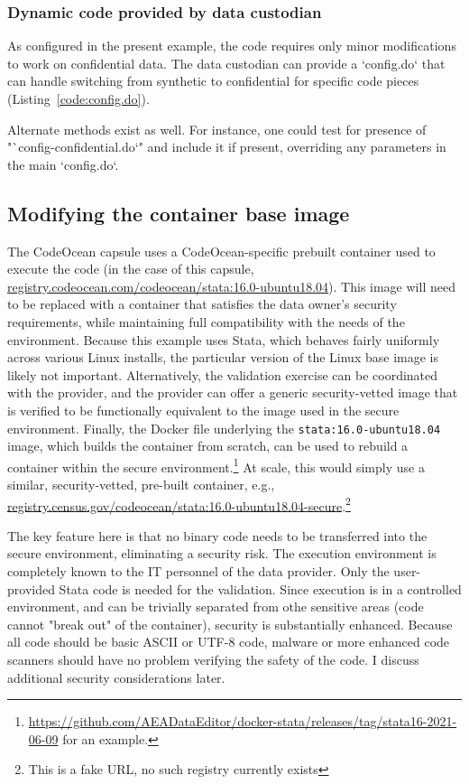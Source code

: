 \documentclass{article}
\begin{document}
\subsubsection{Dynamic code provided by data custodian}

As configured in the present example, the code requires only minor modifications to work on confidential data. The data custodian can provide a `config.do`  that can handle switching from synthetic to confidential for specific code pieces (Listing~\ref{code:config.do}).



Alternate methods exist as well. For instance, one could test for presence of "`config-confidential.do`" and include it if present, overriding any parameters in the main `config.do`.

\subsection{Modifying the container base image}

The CodeOcean capsule uses a CodeOcean-specific prebuilt container used to execute the code (in the case of this capsule, \url{registry.codeocean.com/codeocean/stata:16.0-ubuntu18.04}). This image will need to be replaced with a container that satisfies the data owner's security requirements, while maintaining full compatibility with the needs of the environment. Because this example uses Stata, which behaves fairly uniformly across various Linux installs, the particular version of the Linux base image is likely not important.   Alternatively, the validation exercise can be coordinated with the provider, and the provider can offer a generic security-vetted image that is verified to be functionally equivalent to the image used in the secure environment. Finally, the Docker file underlying the \texttt{stata:16.0-ubuntu18.04} image, which builds the container from scratch, can be used to rebuild a container within the secure environment.\footnote{\href{github.com/AEADataEditor/docker-stata/releases/tag/stata16-2021-06-09}{https://github.com/AEADataEditor/docker-stata/releases/tag/stata16-2021-06-09} for an example.} At scale, this would simply use a similar, security-vetted, pre-built container, e.g., \url{registry.census.gov/codeocean/stata:16.0-ubuntu18.04-secure}.\footnote{This is a fake URL, no such registry currently exists}

The key feature here is that no binary code needs to be transferred into the secure environment, eliminating a security risk. The execution environment is completely known to the IT personnel of the data provider. Only the user-provided Stata code is needed for the validation. Since execution is in a controlled environment, and can be trivially separated from othe sensitive areas (code cannot "break out" of the container), security is substantially enhanced. Because all code should be basic ASCII or UTF-8 code, malware or more enhanced code scanners should have no problem verifying the safety of the code. I discuss additional security considerations later.
\end{document}
